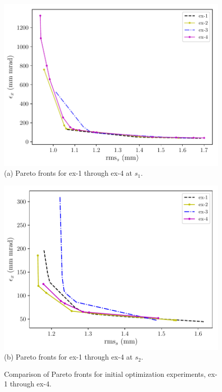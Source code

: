 \begin{figure}
	\centering
	\begin{minipage}{0.49\textwidth}
		\centering
		\includegraphics[width=\textwidth]{figures/ex-pareto1-paperedit}
		(a) Pareto fronts for ex-1 through ex-4 at $s_1$.
	\end{minipage}
	\begin{minipage}{0.49\textwidth}
		\centering
		\includegraphics[width=\textwidth]{figures/ex-pareto2-paperedit}
		(b) Pareto fronts for ex-1 through ex-4 at $s_2$.
	\end{minipage}
	\caption{Comparison of Pareto fronts for initial optimization experiments, ex-1 through ex-4.}
	\label{expareto}
\end{figure}



